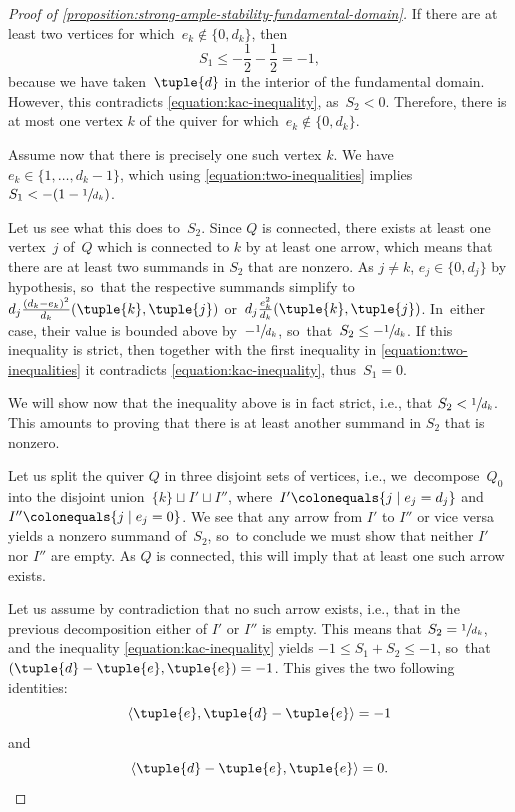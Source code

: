 \begin{proof}[Proof of \cref{proposition:strong-ample-stability-fundamental-domain}]
If there are at least two vertices for which~$e_k\not\in \{0,d_k\}$,
then
\begin{equation*}
S_1\leq-\frac{1}{2}-\frac{1}{2}=-1,
\end{equation*}
because we have taken~$\tuple{d}$ in the interior of the fundamental domain.
However, this contradicts \eqref{equation:kac-inequality},
as~$S_2<0$.
Therefore, there is at most one vertex $k$ of the quiver
for which~$e_k \notin \{0,d_k\}$.

Assume now that there is precisely one such vertex $k$.
We have~$e_k\in\{1,\ldots,d_k-1\}$, which using \eqref{equation:two-inequalities}
implies $S_1 < -(1 - \sfrac{1}{d_k})$.

Let us see what this does to~$S_2$.
Since $Q$ is connected, there exists at least one vertex~$j$ of~$Q$
which is connected to $k$ by at least one arrow,
which means that there are at least two summands in $S_2$ that are nonzero.
As $j \neq k$, $e_j \in \{0, d_j\}$ by hypothesis, so~that the respective summands simplify to~$d_j\frac{(d_k-e_k)^2}{d_k}(\tuple{k},\tuple{j})$
or~$d_j\frac{e_k^2}{d_k}(\tuple{k},\tuple{j})$. In~either case, their value is bounded above by~$-\sfrac{1}{d_k}$, so~that~$S_2\leq-\sfrac{1}{d_k}$.
If this inequality is strict,
then together with the first inequality in \eqref{equation:two-inequalities}
it contradicts \eqref{equation:kac-inequality},
thus~$S_1=0$.

We will show now that the inequality above is in fact strict, i.e., that $S_2 < \sfrac{1}{d_k}$.
This amounts to proving that there is at least another summand in $S_2$ that is nonzero.

Let us split the quiver $Q$ in three disjoint sets of vertices,
i.e., we~decompose~$Q_0$ into
the disjoint union~$\{k\} \sqcup I' \sqcup I''$,
where~$I' \colonequals \{j \mid e_j = d_j\}$ and~$I'' \colonequals \{j \mid e_j = 0\}$.
We see that any arrow from $I'$ to $I''$ or vice versa yields a nonzero summand of~$S_2$, so~to conclude we must show that neither $I'$ nor $I''$ are empty.
As $Q$ is connected, this will imply that at least one such arrow exists.

Let us assume by contradiction that no such arrow exists, i.e.,
that in the previous decomposition either of $I'$ or $I''$ is empty.
This means that $S_2 = \sfrac{1}{d_k}$, and the inequality \eqref{equation:kac-inequality}
yields $-1 \leq S_1 + S_2 \leq -1$, so~that~$(\tuple{d} - \tuple{e}, \tuple{e}) = -1$.
This gives the two following identities:
\begin{equation}\label{equation:contradiction-1}
\langle \tuple{e}, \tuple{d} - \tuple{e} \rangle = -1
\end{equation}
and
\begin{equation}\label{equation:contradiction-2}
\langle \tuple{d} - \tuple{e}, \tuple{e} \rangle = 0.
\end{equation}


\end{proof}
